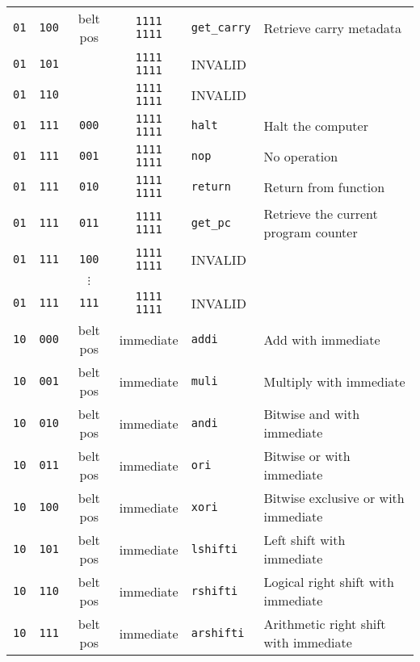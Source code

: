 \documentclass{article}
\begin{document}
\begin{longtable}{c c c c l l}
		\texttt{01} & \texttt{100} & belt pos & \texttt{1111 1111} & \texttt{get\_carry} & Retrieve carry metadata \\
		\texttt{01} & \texttt{101} & & \texttt{1111 1111} & INVALID & \\
		\texttt{01} & \texttt{110} & & \texttt{1111 1111} & INVALID & \\
		\texttt{01} & \texttt{111} & \texttt{000} & \texttt{1111 1111} & \texttt{halt} & Halt the computer \\
		\texttt{01} & \texttt{111} & \texttt{001} & \texttt{1111 1111} & \texttt{nop} & No operation \\
		\texttt{01} & \texttt{111} & \texttt{010} & \texttt{1111 1111} & \texttt{return} & Return from function \\
		\texttt{01} & \texttt{111} & \texttt{011} & \texttt{1111 1111} & \texttt{get\_pc} & Retrieve the current program counter \\
		\texttt{01} & \texttt{111} & \texttt{100} & \texttt{1111 1111} & INVALID & \\
		            &              & \(\vdots\)   &                    &         & \\
		\texttt{01} & \texttt{111} & \texttt{111} & \texttt{1111 1111} & INVALID & \\

		\texttt{10} & \texttt{000} & belt pos & immediate & \texttt{addi} & Add with immediate \\
		\texttt{10} & \texttt{001} & belt pos & immediate & \texttt{muli} & Multiply with immediate \\
		\texttt{10} & \texttt{010} & belt pos & immediate & \texttt{andi} & Bitwise and with immediate \\
		\texttt{10} & \texttt{011} & belt pos & immediate & \texttt{ori} & Bitwise or with immediate \\
		\texttt{10} & \texttt{100} & belt pos & immediate & \texttt{xori} & Bitwise exclusive or with immediate \\
		\texttt{10} & \texttt{101} & belt pos & immediate & \texttt{lshifti} & Left shift with immediate \\
		\texttt{10} & \texttt{110} & belt pos & immediate & \texttt{rshifti} & Logical right shift with immediate \\
		\texttt{10} & \texttt{111} & belt pos & immediate & \texttt{arshifti} & Arithmetic right shift with immediate \\


\end{longtable}
\end{document}
